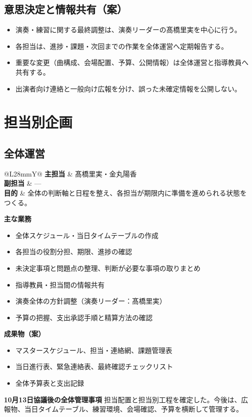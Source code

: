 \documentclass[uplatex,dvipdfmx,a4paper,11pt]{jsarticle}
\makeatletter
\newcommand{\roleheader}[3]{%
  \noindent
  \begin{tabularx}{\linewidth}{@{}L{28mm}Y@{}}
    \rowcolor{LightGray}
    \textbf{主担当} & #1 \\
    \textbf{副担当} & #2 \\
    \textbf{目的} & #3 \\
  \end{tabularx}
  \vspace{0.8em}
}
\makeatother
\begin{document}
\subsection{意思決定と情報共有（案）}
\begin{itemize}
  \item 演奏・練習に関する最終調整は、演奏リーダーの髙橋里実を中心に行う。
  \item 各担当は、進捗・課題・次回までの作業を全体運営へ定期報告する。
  \item 重要な変更（曲構成、会場配置、予算、公開情報）は全体運営と指導教員へ共有する。
  \item 出演者向け連絡と一般向け広報を分け、誤った未確定情報を公開しない。
\end{itemize}

\section{担当別企画}

\subsection{全体運営}
\roleheader{髙橋里実・金丸陽香}{---}{全体の判断軸と日程を整え、各担当が期限内に準備を進められる状態をつくる。}

\textbf{主な業務}
\begin{itemize}
  \item 全体スケジュール・当日タイムテーブルの作成
  \item 各担当の役割分担、期限、進捗の確認
  \item 未決定事項と問題点の整理、判断が必要な事項の取りまとめ
  \item 指導教員・担当間の情報共有
  \item 演奏全体の方針調整（演奏リーダー：髙橋里実）
  \item 予算の把握、支出承認手順と精算方法の確認
\end{itemize}

\textbf{成果物（案）}
\begin{itemize}
  \item マスタースケジュール、担当・連絡網、課題管理表
  \item 当日進行表、緊急連絡表、最終確認チェックリスト
  \item 全体予算表と支出記録
\end{itemize}

\textbf{10月13日協議後の全体管理事項}
担当配置と担当別工程を確定した。今後は、広報物、当日タイムテーブル、練習環境、会場確認、予算を横断して管理する。
\end{document}
